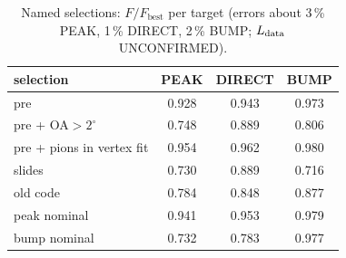 \begin{table}[H]
\centering
\caption{Named selections: $F/F_{\mathrm{best}}$ per target (errors about 3\,\% PEAK, 1\,\% DIRECT,
2\,\% BUMP; $L_{\mathrm{data}}$ UNCONFIRMED).}
\label{tab:s5presets}
\small
\begin{tabular}{@{}l ccc@{}}
\toprule
selection & PEAK & DIRECT & BUMP \\
\midrule
pre                     & 0.928 & 0.943 & 0.973 \\
pre + OA$>2^\circ$       & 0.748 & 0.889 & 0.806 \\
pre + pions in vertex fit & 0.954 & 0.962 & 0.980 \\
slides                  & 0.730 & 0.889 & 0.716 \\
old code                & 0.784 & 0.848 & 0.877 \\
peak nominal            & 0.941 & 0.953 & 0.979 \\
bump nominal            & 0.732 & 0.783 & 0.977 \\
\bottomrule
\end{tabular}
\end{table}

